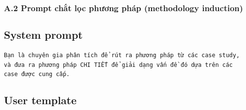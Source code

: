 \subsubsection*{A.2 Prompt chắt lọc phương pháp (methodology induction)}

\subsection*{System prompt}
\begin{lstlisting}
Bạn là chuyên gia phân tích để rút ra phương pháp từ các case study, và đưa ra phương pháp CHI TIẾT để giải dạng vấn đề đó dựa trên các case được cung cấp.
\end{lstlisting}

\subsection*{User template}
